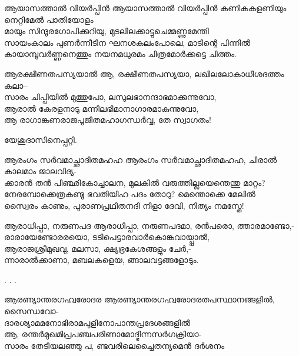 \begin{enumerate}


\begin{slokam}{\VSr}{\VKG}{ആയാസത്താല്‍ വിയര്‍പ്പിന്‍}
ആയാസത്താല്‍ വിയര്‍പ്പിന്‍ കണികകളണിയും നെറ്റിമേല്‍ പാതിയോളം\\
മായും സിന്ദൂരഗോപിക്കുറിയു, മുടലിലക്കാട്ടുചെമ്മണ്ണുമേന്തി\\
സായംകാലം പുണര്‍ന്നീടിന ഘനശകലംപോലെ, മാടിന്റെ പിന്നില്‍\\
കായാമ്പൂവര്‍ണ്ണനെത്തും നയനമധുരമം ചിത്രമോര്‍ക്കട്ടെ ചിത്തം.
\end{slokam}




\begin{slokam}{\VSv}{\UN}{ആരക്ഷീണതപസ്യയാൽ}
ആ, രക്ഷീണതപസ്യയാ, ലഖിലലോകാധീശദത്തം കലാ--\\
സാരം ചിപ്പിയിൽ മുത്തുപോ, ലസുലഭാനന്ദാഭമാക്കുന്നുവോ,\\
ആരാൽ കേരളനാടു മന്നിലഭിമാനാഗാരമാകുന്നുവോ,\\
ആ രാഗാങ്കണരാജപൂജിതമഹാഗന്ധർവ്വ, തേ സ്വാഗതം!
\end{slokam}


യേശുദാസിനെപ്പറ്റി.

\begin{slokam}{\VSr}{\VNM}{ആരംഗം സർവമാച്ഛാദിതമഹഹ}
ആരംഗം സർവമാച്ഛാദിതമഹഹ, ചിരാൽ കാലമാം ജാലവിദ്യ-\\
ക്കാരൻ തൻ പിഞ്ഛികോച്ചാലന, മുലകിൽ വരുത്തില്ലയെന്തെന്തു മാറ്റം?\\
നേരമ്പോക്കെത്രകണ്ടൂ ഭവതിയിഹ പദം തോറു? മെന്തൊക്കെ മേലിൽ\\
സ്വൈരം കാണും, പുരാണപ്രഥിതനദി നിളാ ദേവി, നിത്യം നമസ്തേ!
\end{slokam}



\begin{slokam}{\VMk}{\MPN}{ആരാധിപ്പാ, നരുണപദ}
ആരാധിപ്പാ, നരുണപദമാ, രൻപരൊ, ത്താരമാണ്ടോ,-\\
രാരായേണ്ടോരരയൊ, ടടിപെട്ടാരവാർകൊങ്കവായ്പ്പാൽ,\\
ആരാജശ്രീമുഖവു, മലസാ, ക്ഷ്യഭ്രകേശങ്ങളും ചേർ,-\\
ന്നാരാൽക്കാണാ, മബലകളെയ, ങ്ങാലവട്ടങ്ങളോടും.
\end{slokam}



.
. 
.


\begin{slokam}{\VSv}{\VRV}{ആരണ്യാന്തരഗഹ്വരോദര}
ആരണ്യാന്തരഗഹ്വരോദരതപസ്ഥാനങ്ങളിൽ, സൈന്ധവോ-\\
ദാരശ്യാമമനോഭിരാമപുളിനോപാന്തപ്രദേശങ്ങളിൽ\\
ആ, രന്തർമുഖമിപ്രപഞ്ചപരിണാമോദ്ഭിന്നസർഗക്രിയാ-\\
സാരം തേടിയലഞ്ഞു പ, ണ്ടവരിലെച്ചൈതന്യമെൻ ദർശനം
\end{slokam}


\end{enumerate}
